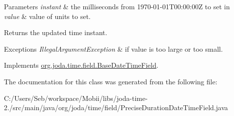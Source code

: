 \begin{DoxyParams}{Parameters}
{\em instant} & the milliseconds from 1970-\/01-\/01\-T00\-:00\-:00\-Z to set in \\
\hline
{\em value} & value of units to set. \\
\hline
\end{DoxyParams}
\begin{DoxyReturn}{Returns}
the updated time instant. 
\end{DoxyReturn}

\begin{DoxyExceptions}{Exceptions}
{\em Illegal\-Argument\-Exception} & if value is too large or too small. \\
\hline
\end{DoxyExceptions}


Implements \hyperlink{classorg_1_1joda_1_1time_1_1field_1_1_base_date_time_field_ace20661fb97d7f15a921bcc8999aa1fc}{org.\-joda.\-time.\-field.\-Base\-Date\-Time\-Field}.



The documentation for this class was generated from the following file\-:\begin{DoxyCompactItemize}
\item 
C\-:/\-Users/\-Seb/workspace/\-Mobii/libs/joda-\/time-\/2./src/main/java/org/joda/time/field/Precise\-Duration\-Date\-Time\-Field.\-java\end{DoxyCompactItemize}

